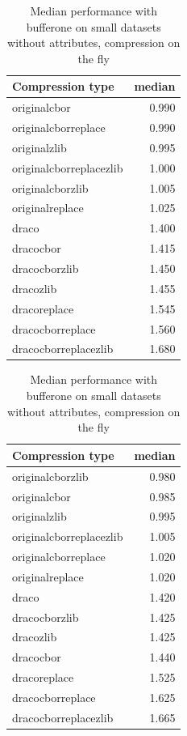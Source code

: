 \begin{table}[!h]
    \begin{minipage}{.5\linewidth}
      \caption{
Median performance with bufferone on small datasets, compression on the fly}
\centering

\begin{tabular}{|l|r|}
\hline
Compression type & median\\
\hline
originalcbor & 0.990\\
\hline
originalcborreplace & 0.990\\
\hline
originalzlib & 0.995\\
\hline
originalcborreplacezlib & 1.000\\
\hline
originalcborzlib & 1.005\\
\hline
originalreplace & 1.025\\
\hline
draco & 1.400\\
\hline
dracocbor & 1.415\\
\hline
dracocborzlib & 1.450\\
\hline
dracozlib & 1.455\\
\hline
dracoreplace & 1.545\\
\hline
dracocborreplace & 1.560\\
\hline
dracocborreplacezlib & 1.680\\
\hline
\end{tabular}
\end{minipage}%
    \begin{minipage}{.5\linewidth}
      \centering
        \caption{
Median performance with bufferone on small datasets without attributes, compression on the fly}

\begin{tabular}{|l|r|}
\hline
Compression type & median\\
\hline
originalcborzlib & 0.980\\
\hline
originalcbor & 0.985\\
\hline
originalzlib & 0.995\\
\hline
originalcborreplacezlib & 1.005\\
\hline
originalcborreplace & 1.020\\
\hline
originalreplace & 1.020\\
\hline
draco & 1.420\\
\hline
dracocborzlib & 1.425\\
\hline
dracozlib & 1.425\\
\hline
dracocbor & 1.440\\
\hline
dracoreplace & 1.525\\
\hline
dracocborreplace & 1.625\\
\hline
dracocborreplacezlib & 1.665\\
\hline
\end{tabular}
\end{minipage} 
\end{table}

